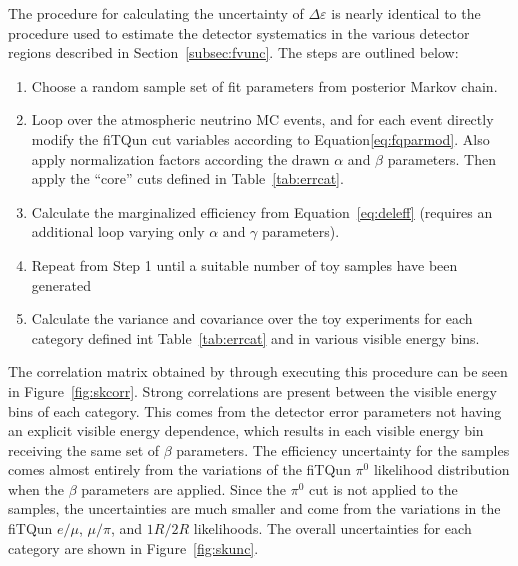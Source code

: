 The procedure for calculating the uncertainty of $\Delta \varepsilon$ is nearly
identical to the procedure used to estimate the detector systematics in the various
detector regions described in Section~\ref{subsec:fvunc}. The steps are outlined
below:

\begin{enumerate}
  \item Choose a random sample set of fit parameters from posterior Markov chain.
  \item Loop over the atmospheric neutrino MC events, and for each event directly modify the fiTQun cut variables
    according to Equation\ref{eq:fqparmod}. Also apply normalization factors according the drawn $\alpha$ and
    $\beta$ parameters.  Then apply the ``core'' cuts defined in Table~\ref{tab:errcat}.
  \item Calculate the marginalized efficiency from Equation~\ref{eq:deleff} (requires an additional
    loop varying only $\alpha$ and $\gamma$ parameters).
  \item Repeat from Step 1 until a suitable number of toy samples have been generated
  \item Calculate the variance and covariance over the toy experiments for each category defined
    int Table~\ref{tab:errcat} and in various visible energy bins.
\end{enumerate}

The correlation matrix obtained by through executing this procedure can be seen
in Figure~\ref{fig:skcorr}.  Strong correlations are present between the
visible energy bins of each category.  This comes from the detector error
parameters not having an explicit visible energy dependence, which results in
each visible energy bin receiving the same set of $\beta$ parameters.  The
efficiency uncertainty for the \nue samples comes almost entirely from the
variations of the fiTQun $\pi^{0}$ likelihood distribution when the $\beta$
parameters are applied.  Since the $\pi^{0}$ cut is not applied to the \numu
samples, the \numu uncertainties are much smaller and come from the variations
in the fiTQun $e/\mu$, $\mu/\pi$, and $1R/2R$ likelihoods.  The overall
uncertainties for each category are shown in Figure~\ref{fig:skunc}.

